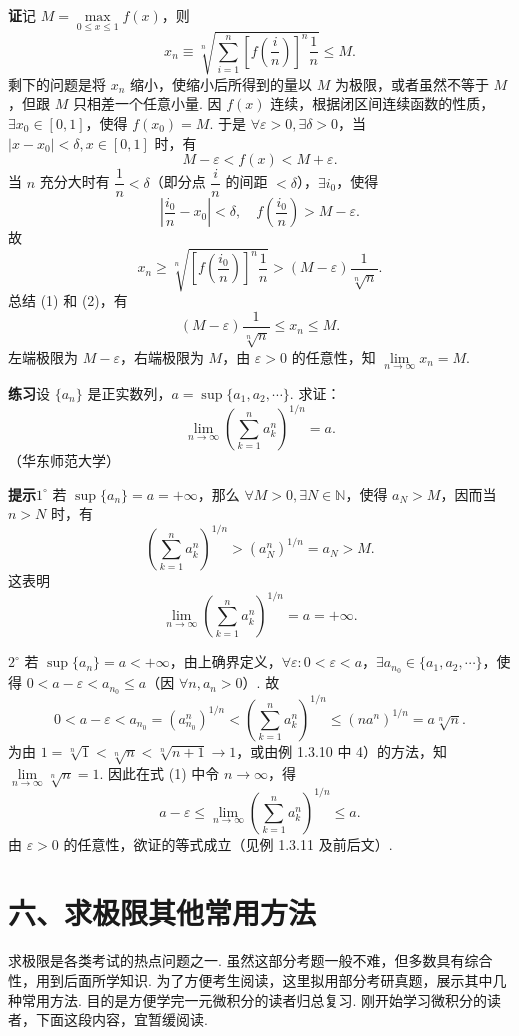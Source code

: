 \documentclass[UTF8,12pt,a4paper,fontset=fandol]{ctexart}
\begin{document}
\noindent\textbf{证}\quad 记 $M=\max\limits_{0\le x\le1}f(x)$，则
\[
  x_n\equiv\sqrt[n]{\sum_{i=1}^n\left[f\left(\frac in\right)\right]^n\frac1n}\le M.
\tag{1}
\]
剩下的问题是将 $x_n$ 缩小，使缩小后所得到的量以 $M$ 为极限，或者虽然不等于 $M$，但跟 $M$ 只相差一个任意小量. 因 $f(x)$ 连续，根据闭区间连续函数的性质，$\exists x_0\in[0,1]$，使得 $f(x_0)=M$. 于是 $\forall\varepsilon>0,\exists\delta>0$，当 $|x-x_0|<\delta,x\in[0,1]$ 时，有
\[
  M-\varepsilon<f(x)<M+\varepsilon.
\]
当 $n$ 充分大时有 $\dfrac1n<\delta$（即分点 $\dfrac in$ 的间距 $<\delta$），$\exists i_0$，使得
\[
  \left|\frac{i_0}{n}-x_0\right|<\delta,\quad
  f\left(\frac{i_0}{n}\right)>M-\varepsilon.
\]
故
\[
x_n\ge
\sqrt[n]{\left[f\left(\frac{i_0}{n}\right)\right]^n\frac1n}
>(M-\varepsilon)\frac1{\sqrt[n]{n}}.
\tag{2}
\]
总结 (1) 和 (2)，有
\[
  (M-\varepsilon)\frac1{\sqrt[n]{n}}\le x_n\le M.
\]
左端极限为 $M-\varepsilon$，右端极限为 $M$，由 $\varepsilon>0$ 的任意性，知 $\lim\limits_{n\to\infty}x_n=M$.

\noindent\textbf{练习}\quad 设 $\{a_n\}$ 是正实数列，$a=\sup\{a_1,a_2,\cdots\}$. 求证：
\[
  \lim_{n\to\infty}\left(\sum_{k=1}^n a_k^n\right)^{1/n}=a.
\]
（华东师范大学）

\noindent\textbf{提示}\quad $1^\circ$ 若 $\sup\{a_n\}=a=+\infty$，那么 $\forall M>0,\exists N\in\mathbb{N}$，使得 $a_N>M$，因而当 $n>N$ 时，有
\[
  \left(\sum_{k=1}^n a_k^n\right)^{1/n}>(a_N^n)^{1/n}=a_N>M.
\]
这表明
\[
  \lim_{n\to\infty}\left(\sum_{k=1}^n a_k^n\right)^{1/n}=a=+\infty.
\]

$2^\circ$ 若 $\sup\{a_n\}=a<+\infty$，由上确界定义，$\forall\varepsilon:0<\varepsilon<a$，$\exists a_{n_0}\in\{a_1,a_2,\cdots\}$，使得 $0<a-\varepsilon<a_{n_0}\le a$（因 $\forall n,a_n>0$）. 故
\[
0<a-\varepsilon<a_{n_0}=(a_{n_0}^n)^{1/n}
<\left(\sum_{k=1}^n a_k^n\right)^{1/n}
\le(na^n)^{1/n}=a\sqrt[n]{n}.
\tag{1}
\]
为由 $1=\sqrt[n]{1}<\sqrt[n]{n}<\sqrt[n]{n+1}\to1$，或由例 1.3.10 中 4）的方法，知 $\lim\limits_{n\to\infty}\sqrt[n]{n}=1$. 因此在式 (1) 中令 $n\to\infty$，得
\[
  a-\varepsilon\le\lim_{n\to\infty}\left(\sum_{k=1}^n a_k^n\right)^{1/n}\le a.
\]
由 $\varepsilon>0$ 的任意性，欲证的等式成立（见例 1.3.11 及前后文）.

\section*{六、求极限其他常用方法}

求极限是各类考试的热点问题之一. 虽然这部分考题一般不难，但多数具有综合性，用到后面所学知识. 为了方便考生阅读，这里拟用部分考研真题，展示其中几种常用方法. 目的是方便学完一元微积分的读者归总复习. 刚开始学习微积分的读者，下面这段内容，宜暂缓阅读.
\end{document}
